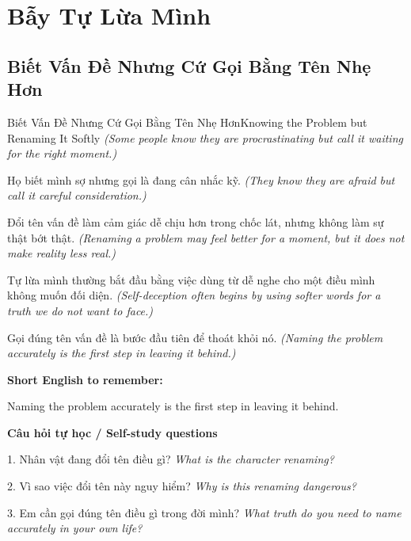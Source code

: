 \chapter{Bẫy Tự Lừa Mình}

\section{Biết Vấn Đề Nhưng Cứ Gọi Bằng Tên Nhẹ Hơn}
\begin{truyen}{Biết Vấn Đề Nhưng Cứ Gọi Bằng Tên Nhẹ Hơn}{Knowing the Problem but Renaming It Softly}
\textit{(Some people know they are procrastinating but call it waiting for the right moment.)}

Họ biết mình sợ nhưng gọi là đang cân nhắc kỹ.
\textit{(They know they are afraid but call it careful consideration.)}

Đổi tên vấn đề làm cảm giác dễ chịu hơn trong chốc lát, nhưng không làm sự thật bớt thật.
\textit{(Renaming a problem may feel better for a moment, but it does not make reality less real.)}

Tự lừa mình thường bắt đầu bằng việc dùng từ dễ nghe cho một điều mình không muốn đối diện.
\textit{(Self-deception often begins by using softer words for a truth we do not want to face.)}

\end{truyen}

\begin{baihoc}
Gọi đúng tên vấn đề là bước đầu tiên để thoát khỏi nó.
\textit{(Naming the problem accurately is the first step in leaving it behind.)}
\end{baihoc}

\begin{ghinhoanh}
\textbf{Short English to remember:}

Naming the problem accurately is the first step in leaving it behind.

\end{ghinhoanh}

\begin{tuhocnhanh}
\textbf{Câu hỏi tự học / Self-study questions}

1. Nhân vật đang đổi tên điều gì? \textit{What is the character renaming?}

2. Vì sao việc đổi tên này nguy hiểm? \textit{Why is this renaming dangerous?}

3. Em cần gọi đúng tên điều gì trong đời mình? \textit{What truth do you need to name accurately in your own life?}
\end{tuhocnhanh}
\ngancach

